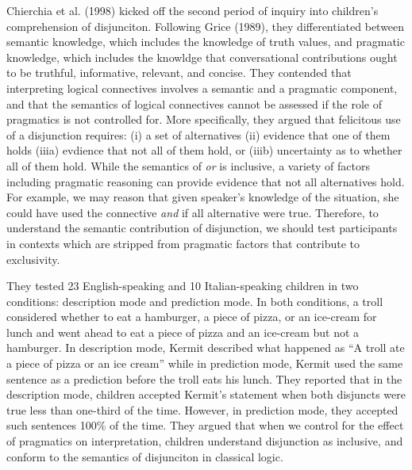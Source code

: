 \documentclass[floatsintext,man]{apa6}
\theoremstyle{definition}
\theoremstyle{definition}
\theoremstyle{definition}
\theoremstyle{remark}
\begin{document}
Chierchia et al. (1998) kicked off the second period of inquiry into
children's comprehension of disjunciton. Following Grice (1989), they
differentiated between semantic knowledge, which includes the knowledge
of truth values, and pragmatic knowledge, which includes the knowldge
that conversational contributions ought to be truthful, informative,
relevant, and concise. They contended that interpreting logical
connectives involves a semantic and a pragmatic component, and that the
semantics of logical connectives cannot be assessed if the role of
pragmatics is not controlled for. More specifically, they argued that
felicitous use of a disjunction requires: (i) a set of alternatives (ii)
evidence that one of them holds (iiia) evdience that not all of them
hold, or (iiib) uncertainty as to whether all of them hold. While the
semantics of \emph{or} is inclusive, a variety of factors including
pragmatic reasoning can provide evidence that not all alternatives hold.
For example, we may reason that given speaker's knowledge of the
situation, she could have used the connective \emph{and} if all
alternative were true. Therefore, to understand the semantic
contribution of disjunction, we should test participants in contexts
which are stripped from pragmatic factors that contribute to
exclusivity.

They tested 23 English-speaking and 10 Italian-speaking children in two
conditions: description mode and prediction mode. In both conditions, a
troll considered whether to eat a hamburger, a piece of pizza, or an
ice-cream for lunch and went ahead to eat a piece of pizza and an
ice-cream but not a hamburger. In description mode, Kermit described
what happened as \enquote{A troll ate a piece of pizza or an ice cream}
while in prediction mode, Kermit used the same sentence as a prediction
before the troll eats his lunch. They reported that in the description
mode, children accepted Kermit's statement when both disjuncts were true
less than one-third of the time. However, in prediction mode, they
accepted such sentences 100\% of the time. They argued that when we
control for the effect of pragmatics on interpretation, children
understand disjunction as inclusive, and conform to the semantics of
disjunciton in classical logic.
\end{document}
